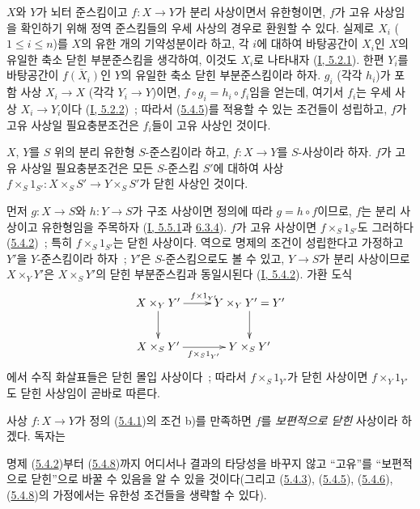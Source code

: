 \begin{env}[5.4.7]
\label{II.5.4.7-ko}
$X$와 $Y$가 뇌터 준스킴이고 $f:X\to Y$가 분리 사상이면서 유한형이면,
$f$가 고유 사상임을 확인하기 위해 정역 준스킴들의 우세 사상의 경우로
환원할 수 있다. 실제로 $X_i$ ($1\leq i\leq n$)를 $X$의 유한 개의
기약성분이라 하고, 각 $i$에 대하여 바탕공간이 $X_i$인 $X$의 유일한
축소 닫힌 부분준스킴을 생각하여, 이것도 $X_i$로 나타내자
(\hyperref[I.5.2.1-ko]{I, 5.2.1}). 한편 $Y_i$를 바탕공간이
$\overline{f(X_i)}$인 $Y$의 유일한 축소 닫힌 부분준스킴이라 하자.
$g_i$ (각각 $h_i$)가 포함 사상 $X_i\to X$ (각각 $Y_i\to Y$)이면,
$f\circ g_i=h_i\circ f_i$임을 얻는데, 여기서 $f_i$는 우세 사상
$X_i\to Y_i$이다 (\hyperref[I.5.2.2-ko]{I, 5.2.2})~; 따라서
(\hyperref[II.5.4.5-ko]{5.4.5})를 적용할 수 있는 조건들이 성립하고,
$f$가 고유 사상일 필요충분조건은 $f_i$들이 고유 사상인 것이다.
\end{env}

\begin{corollary}[5.4.8]
\label{II.5.4.8-ko}
$X$, $Y$를 $S$ 위의 분리 유한형 $S$-준스킴이라 하고,
$f:X\to Y$를 $S$-사상이라 하자. $f$가 고유 사상일 필요충분조건은
모든 $S$-준스킴 $S'$에 대하여 사상
$f\times_S1_{S'}:X\times_SS'\to Y\times_SS'$가 닫힌 사상인 것이다.
\end{corollary}

먼저 $g:X\to S$와 $h:Y\to S$가 구조 사상이면 정의에 따라
$g=h\circ f$이므로, $f$는 분리 사상이고 유한형임을 주목하자
(\hyperref[I.5.5.1-ko]{I, 5.5.1}과
\hyperref[I.6.3.4-ko]{6.3.4}). $f$가 고유 사상이면
$f\times_S1_{S'}$도 그러하다 (\hyperref[II.5.4.2-ko]{5.4.2})~;
특히 $f\times_S1_{S'}$는 닫힌 사상이다. 역으로 명제의 조건이
성립한다고 가정하고 $Y'$을 $Y$-준스킴이라 하자~; $Y'$은
$S$-준스킴으로도 볼 수 있고, $Y\to S$가 분리 사상이므로
$X\times_YY'$은 $X\times_SY'$의 닫힌 부분준스킴과 동일시된다
(\hyperref[I.5.4.2-ko]{I, 5.4.2}). 가환 도식
\[
  \xymatrix{
    X\times_YY'\ar[r]^{f\times1_{Y'}}\ar[d] &
    Y\times_YY'=Y'\ar[d]\\
    X\times_SY'\ar[r]_{f\times_S1_{Y'}} & Y\times_SY'
  }
\]
에서 수직 화살표들은 닫힌 몰입 사상이다~; 따라서
$f\times_S1_{Y'}$가 닫힌 사상이면 $f\times_Y1_{Y'}$도 닫힌 사상임이
곧바로 따른다.

\begin{remark}[5.4.9]
\label{II.5.4.9-ko}
사상 $f:X\to Y$가 정의 (\hyperref[II.5.4.1-ko]{5.4.1})의 조건 b)를
만족하면 $f$를 \emph{보편적으로 닫힌} 사상이라 하겠다. 독자는


명제 (\hyperref[II.5.4.2-ko]{5.4.2})부터
(\hyperref[II.5.4.8-ko]{5.4.8})까지 어디서나 결과의 타당성을 바꾸지
않고 ``고유''를 ``보편적으로 닫힌''으로 바꿀 수 있음을 알 수 있을
것이다(그리고 (\hyperref[II.5.4.3-ko]{5.4.3}),
(\hyperref[II.5.4.5-ko]{5.4.5}),
(\hyperref[II.5.4.6-ko]{5.4.6}),
(\hyperref[II.5.4.8-ko]{5.4.8})의 가정에서는 유한성 조건들을 생략할
수 있다).
\end{remark}

